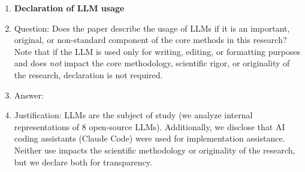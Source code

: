 \begin{enumerate}
\item {\bf Declaration of LLM usage}
    \item[] Question: Does the paper describe the usage of LLMs if it is an important, original, or non-standard component of the core methods in this research? Note that if the LLM is used only for writing, editing, or formatting purposes and does \emph{not} impact the core methodology, scientific rigor, or originality of the research, declaration is not required.
    \item[] Answer: \answerYes{}
    \item[] Justification: LLMs are the subject of study (we analyze internal representations of 8 open-source LLMs). Additionally, we disclose that AI coding assistants (Claude Code) were used for implementation assistance. Neither use impacts the scientific methodology or originality of the research, but we declare both for transparency.
\end{enumerate}
